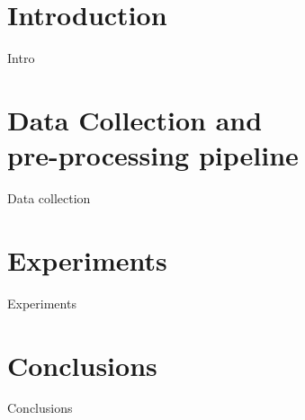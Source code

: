 \documentclass{sig-alternate-05-2015}
\begin{document}
\section{Introduction}
Intro

\section{Data Collection and \\pre-processing pipeline}
Data collection

\section{Experiments}
Experiments

\section{Conclusions}
Conclusions

%

%
%
\end{document}
